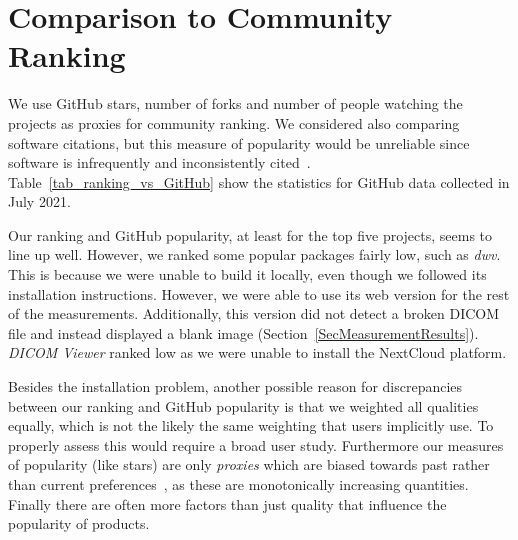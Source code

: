 \documentclass[draft, 12pt, 3p, times]{elsarticle} %
\begin{document}
\section{Comparison to Community Ranking} \label{Sec_VsCommunityRanking}

We use GitHub stars, number of forks and number of people watching the projects
as proxies for community ranking.  We considered also comparing software
citations, but this measure of popularity would be unreliable since software is
infrequently and inconsistently cited~\cite{SmithEtAl2016-softcite}.
Table~\ref{tab_ranking_vs_GitHub} show the statistics for GitHub data collected
in July 2021.

Our ranking and GitHub popularity, at least for the top five projects, seems to
line up well. However, we ranked some popular packages fairly low, such as
\textit{dwv}. This is because we were unable to build it locally, even though we
followed its installation instructions. However, we were able to use its web
version for the rest of the measurements. Additionally, this version did not
detect a broken DICOM file and instead displayed a blank image
(Section~\ref{SecMeasurementResults}).  \textit{DICOM Viewer} ranked low as we
were unable to install the NextCloud platform.

Besides the installation problem, another possible reason for discrepancies
between our ranking and GitHub popularity is that we weighted all qualities
equally, which is not the likely the same weighting that users implicitly use.
To properly assess this would require a broad user study.  Furthermore our
measures of popularity (like stars) are only \emph{proxies} which are biased
towards past rather than current preferences~\cite{Szulik2017}, as these are
monotonically increasing quantities. Finally there are often more factors than
just quality that influence the popularity of products.
\end{document}

